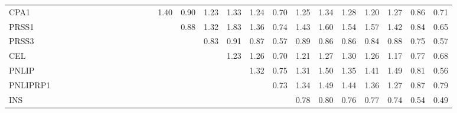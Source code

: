 \begin{longtable}{lrrrrrrrrrrrrrrrrrrrrrrrrr}
CPA1     &              &              &              &              &             &             &             &             &            &            &            &            &        1.40 &        0.90 &      1.23 &        1.33 &           1.24 &      0.70 &          1.25 &      1.34 &        1.28 &        1.20 &       1.27 &        0.86 &        0.71 \\
PRSS1    &              &              &              &              &             &             &             &             &            &            &            &            &             &        0.88 &      1.32 &        1.83 &           1.36 &      0.74 &          1.43 &      1.60 &        1.54 &        1.57 &       1.42 &        0.84 &        0.65 \\
PRSS3    &              &              &              &              &             &             &             &             &            &            &            &            &             &             &      0.83 &        0.91 &           0.87 &      0.57 &          0.89 &      0.86 &        0.86 &        0.84 &       0.88 &        0.75 &        0.57 \\
CEL      &              &              &              &              &             &             &             &             &            &            &            &            &             &             &           &        1.23 &           1.26 &      0.70 &          1.21 &      1.27 &        1.30 &        1.26 &       1.17 &        0.77 &        0.68 \\
PNLIP    &              &              &              &              &             &             &             &             &            &            &            &            &             &             &           &             &           1.32 &      0.75 &          1.31 &      1.50 &        1.35 &        1.41 &       1.49 &        0.81 &        0.56 \\
PNLIPRP1 &              &              &              &              &             &             &             &             &            &            &            &            &             &             &           &             &                &      0.73 &          1.34 &      1.49 &        1.44 &        1.36 &       1.27 &        0.87 &        0.79 \\
INS      &              &              &              &              &             &             &             &             &            &            &            &            &             &             &           &             &                &           &          0.78 &      0.80 &        0.76 &        0.77 &       0.74 &        0.54 &        0.49 \\

\end{longtable}
